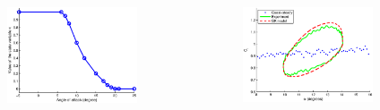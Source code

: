 \documentclass[compress]{beamer}
\begin{document}
\begin{frame}
  \begin{columns}
    \begin{figure}[h]
      \begin{center}
	\includegraphics[width=0.9\textwidth]{./Figures/x_0_vs_alpha.eps}
      \end{center}
    \end{figure}
    \begin{figure}[h]
      \begin{center}
	\includegraphics[width=0.9\textwidth]{./Figures/Cl_u=3_meanaoa=12_amp=2_freq=0p5.eps}
      \end{center}
    \end{figure}

  \end{columns}
\end{frame}
\end{document}
